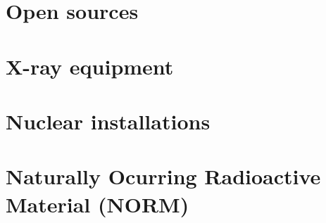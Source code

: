 \section{Open sources}
\section{X-ray equipment}
\section{Nuclear installations}
\section{Naturally Ocurring Radioactive Material (NORM)}
